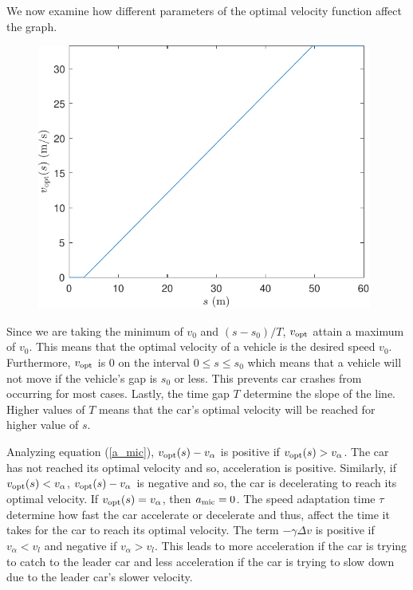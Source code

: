 \documentclass[12pt]{article}
\begin{document}
    We now examine how different parameters of the optimal velocity function affect the graph. 
    \begin{figure}[H]
        \includegraphics[width=11cm]{vopt_versus_s.pdf}
        \centering
    \end{figure}
    Since we are taking the minimum of $v_0$ and $(s-s_0)/T$, $v_{\rm opt}$ attain a maximum of $v_0$. This means that the optimal velocity of a vehicle is the desired speed $v_0$. Furthermore, $v_{\rm opt}$ is $0$ on the interval $0 \leq s \leq s_0$ which means that a vehicle will not move if the vehicle's gap is $s_0$ or less. This prevents car crashes from occurring for most cases. Lastly, the time gap $T$ determine the slope of the line. Higher values of $T$ means that the car's optimal velocity will be reached for higher value of $s$.
    
    Analyzing equation (\ref{a_mic}), $v_{\rm opt} (s) - v_\alpha$ is positive if $v_{\rm opt} (s) > v_\alpha$. The car has not reached its optimal velocity and so, acceleration is positive. Similarly, if  $v_{\rm opt} (s) < v_\alpha$, $v_{\rm opt} (s) - v_\alpha$ is negative and so, the car is decelerating to reach its optimal velocity. If $v_{\rm opt} (s) = v_\alpha$, then $a_{\rm mic} = 0$. The speed adaptation time $\tau$ determine how fast the car accelerate or decelerate and thus, affect the time it takes for the car to reach its optimal velocity. The term $-\gamma \Delta v$ is positive if $v_\alpha < v_l$ and negative if $v_\alpha > v_l$. This leads to more acceleration if the car is trying to catch to the leader car and less acceleration if the car is trying to slow down due to the leader car's slower velocity. 
  
\end{document}

